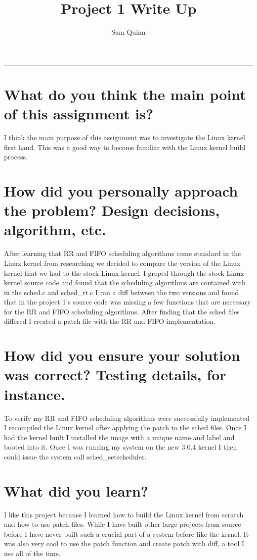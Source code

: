 \documentclass[letterpaper,10pt,notitlepage,fleqn]{article}
\title{Project 1 Write Up}
\author{Sam Quinn}
\begin{document}
\maketitle
\hrule

\section*{What do you think the main point of this assignment is?}
I think the main purpose of this assignment was to investigate the Linux kernel first hand. This was a 
good way to become familiar with the Linux kernel build process.
\section*{How did you personally approach the problem? Design decisions, algorithm, etc.}
After learning that RR and FIFO scheduling algorithms come standard in the Linux kernel 
from researching we decided to compare the version of the Linux kernel that we had to the stock Linux kernel. 
I greped through the stock Linux kernel source code and found that the scheduling algorithms are 
contained with in the sched.c and sched_rt.c I ran a diff between the two versions and found that in 
the project 1's source code was missing a few functions that are necessary for the RR and FIFO scheduling 
algorithms. After finding that the sched files differed I created a patch file with the RR and FIFO implementation.

\section*{How did you ensure your solution was correct? Testing details, for instance.}
To verify my RR and FIFO scheduling algorithms were successfully implemented I recompiled the Linux kernel 
after applying the patch to the sched files. Once I had the kernel built I installed the image with a unique name 
and label and booted into it. Once I was running my system on the new 3.0.4 kernel I then could issue the system call
sched_setscheduler. 
\section*{What did you learn?}
I like this project because I learned how to build the Linux kernel from scratch and how to use patch files. While 
I have built other large projects from source before I have never built such a crucial part of a system before like 
the kernel. It was also very cool to use the patch function and create patch with diff, a tool I use all of the time.
\end{document}
